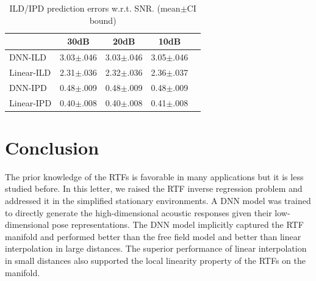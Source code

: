 \documentclass[journal]{IEEEtran}
\begin{document}
\begin{table}
\caption{ILD/IPD prediction errors w.r.t. SNR. (mean$\pm$CI bound)}
\label{table:noise}
\begin{center}
\begin{tabular}{|l|c|c|c|c|}
  \hline
                 & 30dB         & 20dB         & 10dB       \\ \hline \hline
   DNN-ILD     &3.03$\pm$.046  &3.03$\pm$.046 &3.05$\pm$.046  \\ \hline
   Linear-ILD  &2.31$\pm$.036  &2.32$\pm$.036 &2.36$\pm$.037   \\ \hline
   DNN-IPD     & 0.48$\pm$.009 & 0.48$\pm$.009 & 0.48$\pm$.009 \\ \hline
   Linear-IPD  & 0.40$\pm$.008 & 0.40$\pm$.008 &0.41$\pm$.008  \\ \hline
\end{tabular}
\end{center}
\end{table}


\section{Conclusion}

The prior knowledge of the RTFs is favorable in many applications but it is less studied before. In this letter, we raised the RTF inverse regression problem and addressed it in the simplified stationary environments. A DNN model was trained to directly generate the high-dimensional acoustic responses given their low-dimensional pose representations. The DNN model implicitly captured the RTF manifold and performed better than the free field model and better than linear interpolation in large distances. The superior performance of linear interpolation in small distances also supported the local linearity property of the RTFs on the manifold.




\end{document}
